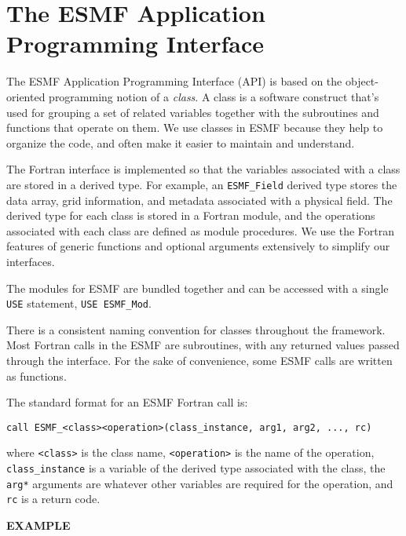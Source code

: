 
\section{The ESMF Application Programming Interface}

The ESMF Application Programming Interface (API) is based on the
object-oriented programming notion of a {\it class}.  A class is a 
software construct that's used for grouping a set of related variables 
together with the subroutines and functions that operate on them.  We 
use classes in ESMF because they help to organize the code, and often 
make it easier to maintain and understand.

The Fortran interface is implemented so that the variables associated
with a class are stored in a derived type.  For example, an 
{\tt ESMF\_Field} derived type stores the data array, grid 
information, and metadata associated with a physical field.
The derived type for each class is stored in a Fortran module, and 
the operations associated with each class are defined as module
procedures.  We use the Fortran features of generic functions and
optional arguments extensively to simplify our interfaces.

The modules for ESMF are bundled together and can be accessed with a 
single {\tt USE} statement, {\tt USE ESMF\_Mod}.

There is a consistent naming convention for classes throughout the
framework.  Most Fortran calls in the ESMF are subroutines, with 
any returned values passed through the interface.  For the sake of 
convenience, some ESMF calls are written as functions.

The standard format for an ESMF Fortran call is:
\begin{verbatim}
call ESMF_<class><operation>(class_instance, arg1, arg2, ..., rc)
\end{verbatim}

where \newline
{\tt <class>} is the class name, \newline
{\tt <operation>} is the name of the operation, \newline 
{\tt class\_instance} is a variable of the derived type associated 
with the class, \newline
the {\tt arg*} arguments are whatever other variables are required 
for the operation, \newline
and {\tt rc} is a return code. \newline

{\bf EXAMPLE}

